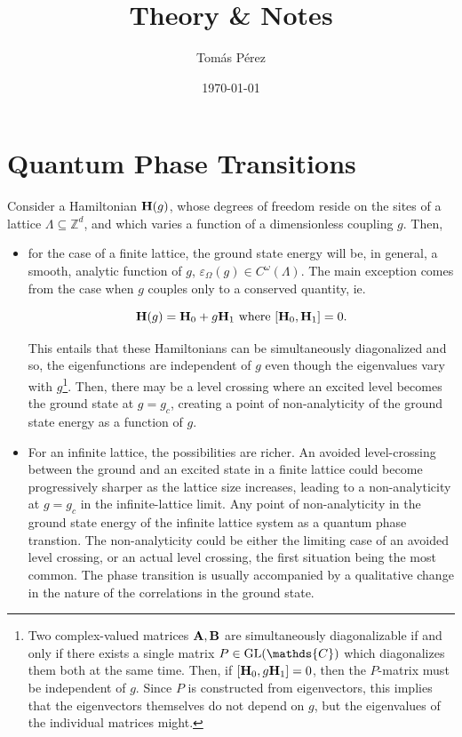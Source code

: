 \documentclass{homework}
\author{Tomás Pérez}
\date{\today}
\title{Theory \& Notes}
\begin{document}
 \maketitle

\section{Quantum Phase Transitions}

Consider a Hamiltonian ${\bf H}(g)$, whose degrees of freedom reside on the sites of a lattice $\Lambda \subseteq \mathds{Z}^d$, and which varies a function of a dimensionless coupling $g$. Then,

\begin{itemize}
    \item for the case of a finite lattice, the ground state energy will be, in general, a smooth, analytic function of $g$, $\varepsilon_{\Omega} (g) \in C^{\omega}(\Lambda) $. The main exception comes from the case when $g$ couples only to a conserved quantity, ie.
    
    $$
        {\bf H}(g) = {\bf H}_0 + g {\bf H}_1 \textnormal{ where } [{\bf H}_0, {\bf H}_1] = 0.  
    $$
    
    This entails that these Hamiltonians can be simultaneously diagonalized and so, the eigenfunctions are independent of $g$ even though the eigenvalues vary with $g$\footnote{Two complex-valued matrices ${\bf A}, {\bf B}$ are simultaneously diagonalizable if and only if there exists a single matrix $P \in \textnormal{GL}(\mathds{C})$ which diagonalizes them both at the same time. Then, if $[{\bf H}_0, g{\bf H}_1] = 0$, then the $P$-matrix must be independent of $g$. Since $P$ is constructed from eigenvectors, this implies that the eigenvectors themselves do not depend on $g$, but the eigenvalues of the individual matrices might.}. Then, there may be a level crossing where an excited level becomes the ground state at $g = g_c$, creating a point of non-analyticity of the ground state energy as a function of $g$. \\
    
    \item For an infinite lattice, the possibilities are richer. An avoided level-crossing between the ground and an excited state in a finite lattice could become progressively sharper as the lattice size increases, leading to a non-analyticity at $g = g_c$ in the infinite-lattice limit. Any point of non-analyticity in the ground state energy of the infinite lattice system as a quantum phase transtion. The non-analyticity could be either the limiting case of an avoided level crossing, or an actual level crossing, the first situation being the most common. The phase transition is usually accompanied by a qualitative change in the nature of the correlations in the ground state. \\
\end{itemize}
\end{document}
